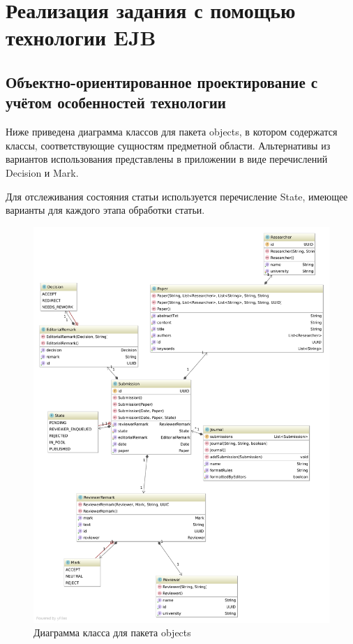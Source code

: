 \section{Реализация задания с помощью технологии EJB}

\subsection{Объектно-ориентированное проектирование с учётом особенностей технологии}

Ниже приведена диаграмма классов для пакета objects, в котором содержатся классы, соответствующие сущностям предметной области. Альтернативы из вариантов использования представлены в приложении в виде перечислений Decision и Mark.

Для отслеживания состояния статьи используется перечисление State, имеющее варианты для каждого этапа обработки статьи.

\begin{figure}[H]
\centering
\includegraphics[width=\textwidth]{diagram.pdf}
\caption{Диаграмма класса для пакета objects}
\end{figure}

